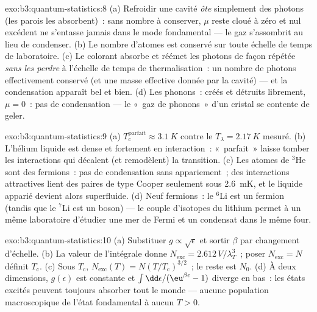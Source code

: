 \begin{solution}{exo:b3:quantum-statistics:8}
(a) Refroidir une cavité \emph{ôte} simplement des photons (les
parois les absorbent)~: sans nombre à conserver, $\mu$ reste cloué à
zéro et nul excédent ne s'entasse jamais dans le mode fondamental ---
le gaz s'assombrit au lieu de condenser. (b) Le nombre d'atomes est
conservé sur toute échelle de temps de laboratoire. (c) Le colorant
absorbe et réémet les photons de façon répétée \emph{sans les perdre}
à l'échelle de temps de thermalisation~: un nombre de photons
effectivement conservé (et une masse effective donnée par la cavité)
--- et la condensation apparaît bel et bien. (d) Les phonons~: créés
et détruits librement, $\mu = 0$~: pas de condensation --- le «~gaz
de phonons~» d'un cristal se contente de geler.
\end{solution}

\begin{solution}{exo:b3:quantum-statistics:9}
(a) $T_{\text{c}}^{\text{parfait}} \approx \qty{3.1}{K}$ contre le
$T_\lambda = \qty{2.17}{K}$ mesuré. (b) L'hélium liquide est dense et
fortement en interaction~: «~parfait~» laisse tomber les interactions
qui décalent (et remodèlent) la transition. (c) Les atomes de $^3$He
sont des fermions~: pas de condensation sans appariement~; des
interactions attractives lient des paires de type Cooper seulement
sous \qty{2.6}{mK}, et le liquide apparié devient alors superfluide.
(d) Neuf fermions~: le $^6$Li est un fermion (tandis que le $^7$Li
est un boson) --- le couple d'isotopes du lithium permet à un même
laboratoire d'étudier une mer de Fermi et un condensat dans le même
four.
\end{solution}

\begin{solution}{exo:b3:quantum-statistics:10}
(a) Substituer $g \propto \sqrt\epsilon$ et sortir $\beta$ par
changement d'échelle. (b) La valeur de l'intégrale donne $N_{\text{exc}} =
2.612\,V/\lambda_T^3$~; poser $N_{\text{exc}} = N$ définit
$T_{\text{c}}$. (c) Sous $T_{\text{c}}$, $N_{\text{exc}}(T) =
N(T/T_{\text{c}})^{3/2}$~; le reste est $N_0$. (d) À deux
dimensions, $g(\epsilon)$ est constante et $\int\dd\epsilon/(\eu^{
\beta\epsilon} - 1)$ diverge en bas~: les états excités peuvent
toujours absorber tout le monde --- aucune population macroscopique
de l'état fondamental à aucun $T > 0$.
\end{solution}

